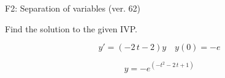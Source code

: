 \begin{exercise}
  \begin{exerciseTitle}F2: Separation of variables (ver. 62)\end{exerciseTitle}
  \begin{exerciseStatement}
    
Find the solution to the given IVP.

    
\[y'=( -2 \, t - 2 )y\hspace{1em} y(0)= -e\]

  \end{exerciseStatement}
  \begin{exerciseAnswer}
    
\[y= -e^{\left(-t^{2} - 2 \, t + 1\right)}\]

  \end{exerciseAnswer}
\end{exercise}